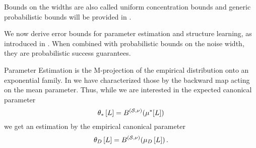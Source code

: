 Bounds on the widths are also called uniform concentration bounds \cite{goesmann_uniform_2021} and generic probabilistic bounds will be provided in .


We now derive error bounds for parameter estimation and structure learning, as introduced in .
When combined with probabilistic bounds on the noise width, they are probabilistic success guarantees.



Parameter Estimation is the M-projection of the empirical distribution onto an exponential family.
In  we have characterized those by the backward map acting on the mean parameter.
Thus, while we are interested in the expected canonical parameter
\[
    \theta_{*}\left[L\right] = B^{(\mathcal{S},\nu)}(\mu^*[L])
\]
we get an estimation by the empirical canonical parameter
\[
    \theta_{D}\left[L\right]  = B^{(\mathcal{S},\nu)}(\mu_{D}\left[L\right]) \, .
\]

